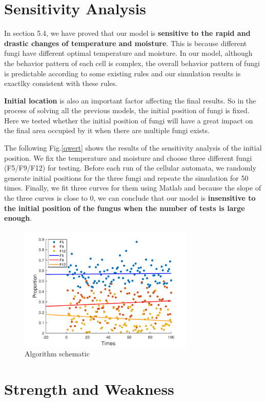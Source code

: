 \documentclass[a4paper,12pt]{article}
\begin{document}
\section{Sensitivity Analysis}
\par In section 5.4, we have proved that our model is \textbf{sensitive to the rapid and drastic changes of temperature and moisture}. This is because different fungi have different optimal temperature and moisture. In our model, although the behavior pattern of each cell is complex, the overall behavior pattern of fungi is predictable according to some existing rules and our simulation results is exactlky consistent with these rules.
\par \textbf{Initial location} is also an important factor affecting the final results. So in the process of solving all the previous models, the initial position of fungi is fixed. Here we tested whether the initial position of fungi will have a great impact on the final area occupied by it when there are multiple fungi exists.
\par The following Fig.\eqref{qwert} shows the results of the sensitivity analysis of the initial position. We fix the temperature and moisture and choose three different fungi (F5/F9/F12) for testing. Before each run of the cellular automata, we randomly generate initial positions for the three fungi and repeate the simulation for 50 times. Finally, we fit three curves for them using Matlab and because the slope of the three curves is close to 0, we can conclude that our model is \textbf{insensitive to the initial position of the fungus when the number of tests is large enough}.
\vspace{-0.3cm}
\begin{figure}[H] 
	\centering 
	\includegraphics[height=6cm]{./picture/sensitivity.pdf}
	\caption{Algorithm schematic}
	\label{qwert}
\end{figure}

\section{Strength and Weakness}
\end{document}
